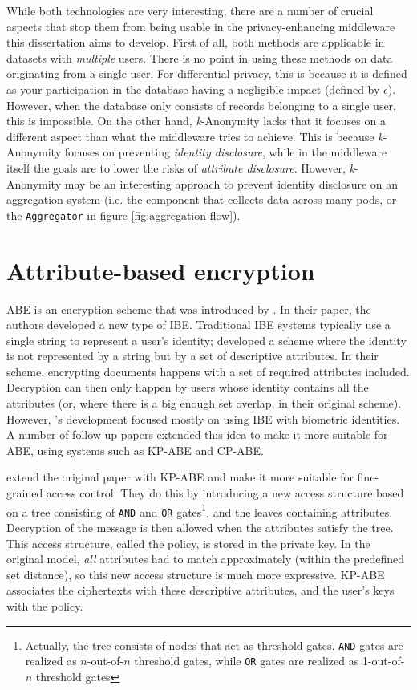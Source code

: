 While both technologies are very interesting, there are a number of crucial aspects that stop them from being usable in the privacy-enhancing middleware this dissertation aims to develop. First of all, both methods are applicable in datasets with \textit{multiple} users. There is no point in using these methods on data originating from a single user. For differential privacy, this is because it is defined as your participation in the database having a negligible impact (defined by $\epsilon$). However, when the database only consists of records belonging to a single user, this is impossible. On the other hand, \textit{k}-Anonymity lacks that it focuses on a different aspect than what the middleware tries to achieve. This is because \textit{k}-Anonymity focuses on preventing \textit{identity disclosure}, while in the middleware itself the goals are to lower the risks of \textit{attribute disclosure}. However, \textit{k}-Anonymity may be an interesting approach to prevent identity disclosure on an aggregation system (i.e. the component that collects data across many pods, or the \texttt{Aggregator} in figure \ref{fig:aggregation-flow}).

\section{Attribute-based encryption}
\acrfull{ABE} is an encryption scheme that was introduced by \citet*{fuzzy-ibe}. In their paper, the authors developed a new type of \acrfull{IBE}. Traditional \gls{IBE} systems typically use a single string to represent a user's identity; \citeauthor*{fuzzy-ibe} developed a scheme where the identity is not represented by a string but by a set of descriptive attributes. In their scheme, encrypting documents happens with a set of required attributes included. Decryption can then only happen by users whose identity contains all the attributes (or, where there is a big enough set overlap, in their original scheme). However, \citeauthor*{fuzzy-ibe}'s development focused mostly on using \gls{IBE} with biometric identities. A number of follow-up papers extended this idea to make it more suitable for \gls{ABE}, using systems such as \gls{KP-ABE} and \gls{CP-ABE}.

\citet{kp-abe} extend the original paper with \acrfull{KP-ABE} and make it more suitable for fine-grained access control. They do this by introducing a new access structure based on a tree consisting of \texttt{AND} and \texttt{OR} gates\footnote{Actually, the tree consists of nodes that act as threshold gates. \texttt{AND} gates are realized as $n$-out-of-$n$ threshold gates, while \texttt{OR} gates are realized as 1-out-of-$n$ threshold gates}, and the leaves containing attributes. Decryption of the message is then allowed when the attributes satisfy the tree. This access structure, called the policy, is stored in the private key. In the original model, \textit{all} attributes had to match approximately (within the predefined set distance), so this new access structure is much more expressive. \Gls{KP-ABE} associates the ciphertexts with these descriptive attributes, and the user's keys with the policy.


